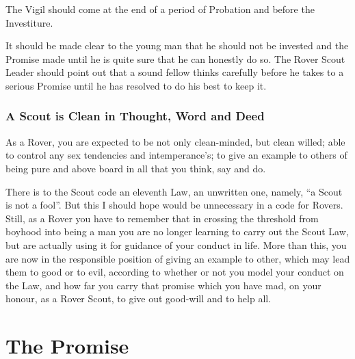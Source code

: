 \documentclass[11pt]{article}
\begin{document}
The Vigil should come at the end of a period of Probation and before the Investiture.

It should be made clear to the young man that he should not be invested and the Promise made until he is quite sure that he can honestly do so. The Rover Scout Leader should point out that a sound fellow thinks carefully before he takes to a serious Promise until he has resolved to do his best to keep it.


\subsubsection{A Scout is Clean in Thought, Word and Deed}
As a Rover, you are expected to be not only clean-minded, but clean  willed; able to control any sex tendencies and intemperance's; to give an example to others of being pure and above board in all that you think, say and do.

There is to the Scout code an eleventh Law, an unwritten one, namely, ``a Scout is not a fool''. But this I should hope would be unnecessary in a code for Rovers. Still, as a Rover you have to remember that in crossing the threshold from boyhood into being a man you are no longer learning to carry out the Scout Law, but are actually using it for guidance of your conduct in life. More than this, you are now in the responsible position of giving an example to other, which may lead them to good or to evil, according to whether or not you model your conduct on the Law, and how far you carry that promise which you have mad, on your honour, as a Rover Scout, to give out good-will and to help all.


\section{The Promise}
\end{document}
